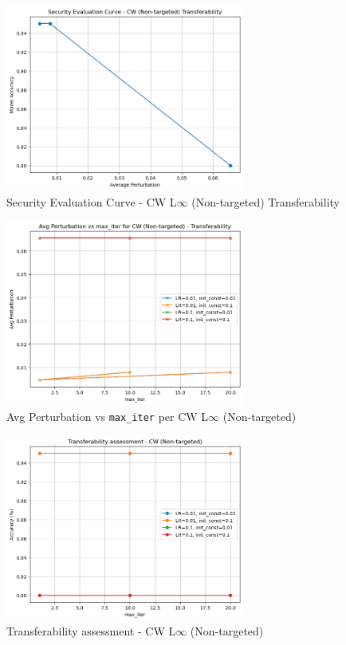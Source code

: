         \begin{figure}[H]
          \centering
          \includegraphics[width=0.7\textwidth]{images/cwtras3.png}
          \caption{Security Evaluation Curve - CW L$\infty$ (Non-targeted) Transferability}
          \label{fig:cw_transfer1}
        \end{figure}
        
        \begin{figure}[H]
          \centering
          \includegraphics[width=0.7\textwidth]{images/cwtras2.png}
          \caption{Avg Perturbation vs \texttt{max\_iter} per CW L$\infty$ (Non-targeted)}
          \label{fig:cw_transfer2}
        \end{figure}
        
        \begin{figure}[H]
          \centering
          \includegraphics[width=0.7\textwidth]{images/cwtras1.png}
          \caption{Transferability assessment - CW L$\infty$ (Non-targeted)}
          \label{fig:cw_transfer3}
        \end{figure}

